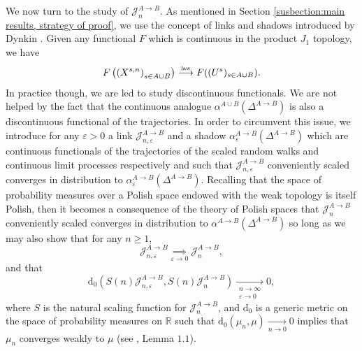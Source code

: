 \documentclass[10pt,a4paper]{amsart}
\newcommand{\RR}{\mathbb R}
\newcommand{\J}{\mathcal J}
\newcommand{\1}{\mathds{1}}
\renewcommand{\d}{\mathrm d}
\newcommand{\distribution}{\stackrel{\scaleto{\mathrm{law}}{4pt}}{\longrightarrow}}
\numberwithin{equation}{section}
\begin{document}
We now turn to the study of $\J_n^{A\rightarrow B}$. As mentioned in Section \ref{susbection:main results, strategy of proof}, we use the concept of links and shadows introduced by Dynkin \cite{DynkinSelf-IntersectionGauge1988}. Given any functional $F$ which is continuous in the product $J_1$ topology, we have
\begin{equation*}
    F\left(\left(X^{s,n}\right)_{s\in A\cup B}\right)\distribution F((U^s)_{s\in A\cup B}).
\end{equation*}
In practice though, we are led to study discontinuous functionals. We are not helped by the fact that the continuous analogue $\alpha^{A\cup B}(\Delta^{A\rightarrow B})$ is also a discontinuous functional of the trajectories. In order to circumvent this issue, we introduce for any $\varepsilon>0$ a link $\J_{n,\varepsilon}^{A\rightarrow B}$ and a shadow $\alpha_\varepsilon^{A\rightarrow B}(\Delta^{A\rightarrow B})$ which are continuous functionals of the trajectories of the scaled random walks and continuous limit processes respectively and such that $\J_{n,\varepsilon}^{A\rightarrow B}$ conveniently scaled converges in distribution to $\alpha_\varepsilon^{A\rightarrow B}(\Delta^{A\rightarrow B})$. Recalling that the space of probability measures over a Polish space endowed with the weak topology is itself Polish, then it becomes a consequence of the theory of Polish spaces that $\J_n^{A\rightarrow B}$ conveniently scaled converges in distribution to $\alpha^{A\rightarrow B}(\Delta^{A\rightarrow B})$ so long as we may also show that for any $n\ge1$,
\begin{equation}
\label{convergence:the link is close to the initial variable at n fixed}
    \J_{n,\varepsilon}^{A\rightarrow B}\underset{\varepsilon\rightarrow 0}\implies \J_n^{A\rightarrow B},
\end{equation}
and that 
\begin{equation}
    \label{convergence:the link is close to the initial variable uniformly strongly}
    \d_0\left( S(n)\J_{n,\varepsilon}^{A\rightarrow B},S(n)\J_n^{A\rightarrow B}\right)\underset{\substack{n\rightarrow\infty \\ \varepsilon\rightarrow 0}}\longrightarrow0,
\end{equation}
where $S$ is the natural scaling function for $\J_n^{A\rightarrow B}$, and $\d_0$ is a generic metric on the space of probability measures on $\RR$ such that $\d_0(\mu_n,\mu)\underset{n\rightarrow0}\longrightarrow0$ implies that $\mu_n$ converges weakly to $\mu$ (see \cite{DynkinSelf-IntersectionGauge1988}, Lemma $1.1$).
\end{document}
